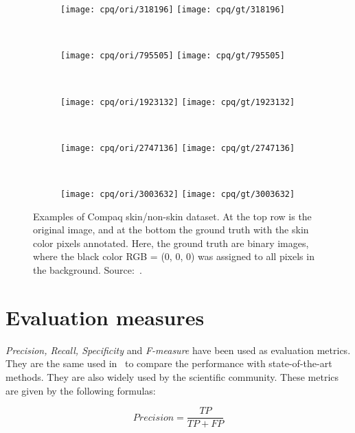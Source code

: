 \begin{figure}[H]
    \centering
    \begin{subfigure}[t]{0.269\textwidth}
        \texttt{[image: cpq/ori/318196]}
        \texttt{[image: cpq/gt/318196]}
    \end{subfigure}
    ~
    \begin{subfigure}[t]{0.214\textwidth}
        \texttt{[image: cpq/ori/795505]}
        \texttt{[image: cpq/gt/795505]}
    \end{subfigure}
    ~
    \begin{subfigure}[t]{0.132\textwidth}
        \texttt{[image: cpq/ori/1923132]}
        \texttt{[image: cpq/gt/1923132]}
    \end{subfigure}
    ~
    \begin{subfigure}[t]{0.14\textwidth}
        \texttt{[image: cpq/ori/2747136]}
        \texttt{[image: cpq/gt/2747136]}
    \end{subfigure}
    ~
    \begin{subfigure}[t]{0.12\textwidth}
        \texttt{[image: cpq/ori/3003632]}
        \texttt{[image: cpq/gt/3003632]}
    \end{subfigure}
    \caption[Examples of Compaq skin/non-skin dataset]{Examples of Compaq skin/non-skin dataset. At the top row is the original image, and at the bottom the ground truth with the skin color pixels annotated. Here, the ground truth are binary images, where the black color RGB = (0, 0, 0) was assigned to all pixels in the background. Source:~\citet{jones:02}.}
    \label{fig:compaq_dataset_example}
\end{figure}



\section{Evaluation measures}
\label{sec:evaluation_measures}

\textit{Precision, Recall, Specificity} and \textit{F-measure} have been used as evaluation metrics. They are the same used in~\citet{brancati:17} to compare the performance with state-of-the-art methods. They are also widely used by the scientific community. These metrics are given by the following formulas:

\begin{equation*}
    Precision = \frac{TP}{TP + FP}
    \label{eq:precision}
\end{equation*}

